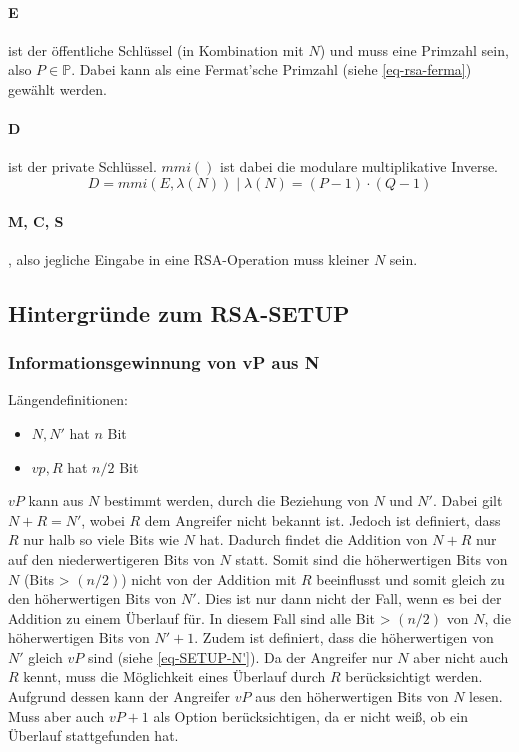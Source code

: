             \paragraph{E} ist der öffentliche Schlüssel (in Kombination mit $N$) und muss eine Primzahl sein, also $P \in \mathbb{P}$. Dabei kann als eine Fermat'sche Primzahl (siehe \ref{eq-rsa-ferma}) gewählt werden.

            \paragraph{D} ist der private Schlüssel. $mmi()$ ist dabei die modulare multiplikative Inverse.
            \begin{equation}
                D = mmi(E, \lambda(N)) \mid \lambda(N) = (P-1)\cdot(Q-1)
            \end{equation}

            \paragraph{M, C, S}, also jegliche Eingabe in eine \ac{RSA}-Operation muss kleiner $N$ sein.
            

        \subsection{Hintergründe zum RSA-SETUP}
            \subsubsection{Informationsgewinnung von vP aus N} \label{sec-SETUP-vP_from_N}
            Längendefinitionen:
            \begin{itemize}
                \item $N, N'$ hat $n$ Bit
                \item $vp, R$ hat $n/2$ Bit
            \end{itemize}
            $vP$ kann aus $N$ bestimmt werden, durch die Beziehung von $N$ und $N'$. Dabei gilt $N + R = N'$, wobei $R$ dem Angreifer nicht bekannt ist. Jedoch ist definiert, dass $R$ nur halb so viele Bits wie $N$ hat. Dadurch findet die Addition von $N + R$ nur auf den niederwertigeren Bits von $N$ statt. Somit sind die höherwertigen Bits von $N$ (Bits > $(n/2)$) nicht von der Addition mit $R$ beeinflusst und somit gleich zu den höherwertigen Bits von $N'$. Dies ist nur dann nicht der Fall, wenn es bei der Addition zu einem Überlauf für. In diesem Fall sind alle Bit > $(n/2)$ von $N$, die höherwertigen Bits von $N' + 1$.
            Zudem ist definiert, dass die höherwertigen von $N'$ gleich $vP$ sind (siehe \ref{eq-SETUP-N'}).
            Da der Angreifer nur $N$ aber nicht auch $R$ kennt, muss die Möglichkeit eines Überlauf durch $R$ berücksichtigt werden. 
            Aufgrund dessen kann der Angreifer $vP$ aus den höherwertigen Bits von $N$ lesen. Muss aber auch $vP + 1$ als Option berücksichtigen, da er nicht weiß, ob ein Überlauf stattgefunden hat.               

